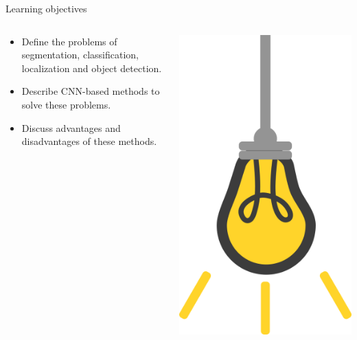 \documentclass[9pt, aspectratio=169]{beamer}
\begin{document}
\begin{frame}
    {Learning objectives}
    \begin{columns}
        \begin{column}{0.8\textwidth}
            \begin{itemize}
                \item Define the problems of segmentation, classification, localization and object detection.
                \item Describe CNN-based methods to solve these problems.
                \item Discuss advantages and disadvantages of these methods.
            \end{itemize}
        \end{column}
        \begin{column}{0.2\textwidth}
            \includegraphics[angle=-30, origin=tr, width=1.5\textwidth]{lightbulb.png}
        \end{column}
    \end{columns}
\end{frame}
\end{document}
